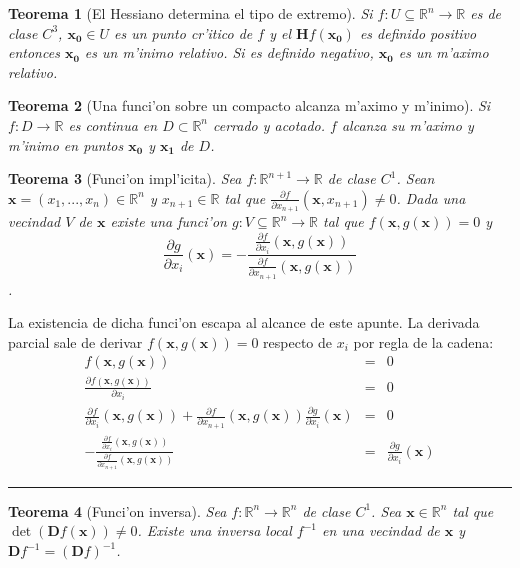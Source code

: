 \documentclass[a4paper,spanish]{article}
\newcommand{\R}[0]{\mathbb{R}}
\newcommand{\xx}[0]{\mathbf{x}}
\newcommand{\xO}[0]{\mathbf{x_0}}
\newcommand{\parcial}[2]{\frac{\partial #1}{\partial #2}}
\newcommand{\D}[0]{\mathbf{D}}
\newcommand{\He}[0]{\mathbf{H}}
\newtheorem{teo}{Teorema}
\newenvironment{demo}{{\noindent \textbf{Demo: }}}{\hfill\rule{2mm}{2mm}\par}
\begin{document}
\begin{teo}[El Hessiano determina el tipo de extremo]
\label{teo-max-min-relativo}
Si $f : U \subseteq \R^n \to \R$ es de clase $C^3$, $\xO \in U$ es un punto
cr'itico de $f$ y el $\He f(\xO)$ es definido positivo entonces $\xO$ es un 
m'inimo relativo. Si es definido negativo, $\xO$ es un m'aximo relativo.
\end{teo}

\begin{teo}[Una funci'on sobre un compacto alcanza m'aximo y m'inimo]
\label{teo-max-min-absoluto}
Si $f : D \to \R$ es continua en $D \subset \R^n$ cerrado y acotado. $f$ 
alcanza su m'aximo y m'inimo en puntos $\xO$ y $\mathbf{x_1}$ de $D$.
\end{teo}

\begin{teo}[Funci'on impl'icita]
\label{teo-funcion-implicita}
Sea $f : \R^{n+1} \to \R$ de clase $C^1$. Sean $\xx = (x_1,...,x_n) \in \R^n$ y
$x_{n+1} \in \R$ tal que $\parcial{f}{x_{n+1}}(\xx, x_{n+1}) \neq 0$. 
Dada una vecindad $V$ de $\xx$ existe una funci'on 
$g : V \subseteq \R^n \to \R$ tal que $f(\xx, g(\xx)) = 0$ y
$$\parcial{g}{x_i}(\xx) = - \frac{\displaystyle \parcial{f}{x_i}(\xx, g(\xx))}
								 {\displaystyle \parcial{f}{x_{n+1}}(\xx, g(\xx))}$$.
\end{teo}

\begin{demo}
La existencia de dicha funci'on escapa al alcance de este apunte. La derivada
parcial sale de derivar $f(\xx, g(\xx)) = 0$ respecto de $x_i$ por regla de la
cadena:
\begin{eqnarray*}
f(\xx, g(\xx)) &=& 0 \\
\parcial{f(\xx, g(\xx))}{x_i} &=& 0 \\
\parcial{f}{x_i}(\xx, g(\xx)) + 
	\parcial{f}{x_{n+1}}(\xx, g(\xx)) \parcial{g}{x_i}(\xx) &=& 0 \\
- \frac{\displaystyle \parcial{f}{x_i}(\xx, g(\xx))}
 	   {\displaystyle \parcial{f}{x_{n+1}}(\xx, g(\xx))} &=& 
 	   		\parcial{g}{x_i}(\xx)
\end{eqnarray*}
\end{demo}

\begin{teo}[Funci'on inversa]
\label{teo-funcion-inversa}
Sea $f : \R^n \to \R^n$ de clase $C^1$. Sea $\xx \in \R^n$ tal que 
$\det(\D f(\xx)) \neq 0$. Existe una inversa local $f^{-1}$ en una vecindad de
$\xx$ y $\D f^{-1} = (\D f)^{-1}$.
\end{teo}
\end{document}
